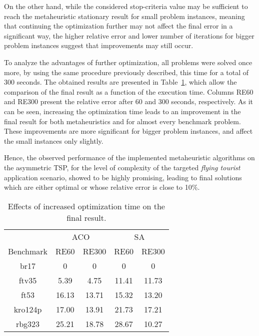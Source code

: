 On the other hand, while the considered stop-criteria value may be sufficient to reach the metaheuristic stationary result for small problem instances, meaning that continuing the optimization further may not affect the final error in a significant way, the higher relative error and lower number of iterations for bigger problem instances suggest that improvements may still occur.%

To analyze the advantages of further optimization, all problems were solved once more, by using the same procedure previously described, this time for a total of 300 seconds. The obtained results are presented in Table~\ref{tab:further_opt}, which allow the comparison of the final result as a function of the execution time. Columns RE60 and RE300 present the relative error after 60 and 300 seconds, respectively. As it can be seen, increasing the optimization time leads to an improvement in the final result for both metaheuristics and for almost every benchmark problem. These improvements are more significant for bigger problem instances, and affect the small instances only slightly.

Hence, the observed performance of the implemented metaheuristic algorithms on the asymmetric TSP, for the level of complexity of the targeted \textit{flying tourist} application scenario, showed to be highly promising, leading to final solutions which are either optimal or whose relative error is close to 10\%. 

\begin{table}[t]
\centering
\caption{Effects of increased optimization time on the final result.}
\label{tab:further_opt}
\begin{tabular}{ccccc}
\hline
         & \multicolumn{2}{c}{ACO} & \multicolumn{2}{c}{SA} \\
Benchmark & RE60      & RE300      & RE60       & RE300      \\ \hline
br17     & 0          & 0          & 0         & 0          \\
ftv35    & 5.39       & 4.75           & 11.41     & 11.73      \\
ft53     & 16.13      & 13.71 			& 15.32     & 13.20      \\
kro124p   & 17.00       & 13.91            & 21.73     & 17.21      \\
rbg323   & 25.21      & 18.78            & 28.67     & 10.27      \\
\hline
\end{tabular}
\end{table}



